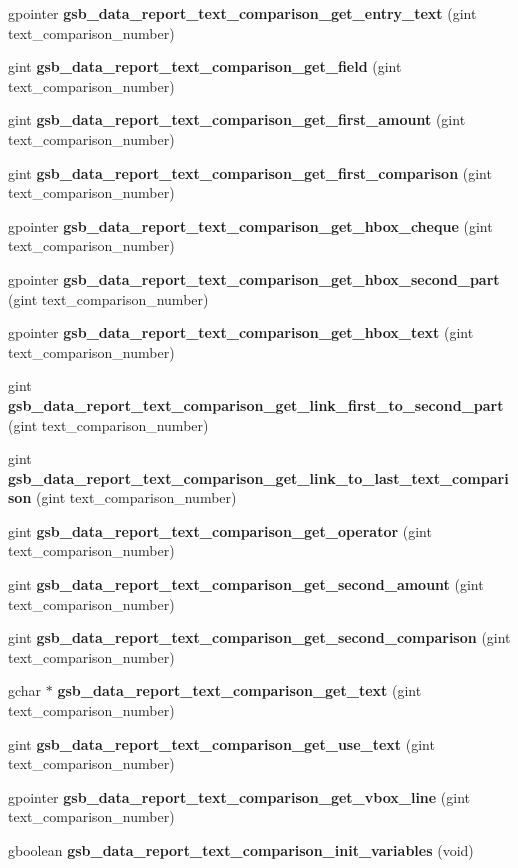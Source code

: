 \begin{DoxyCompactItemize}
gpointer {\bf gsb\_\-data\_\-report\_\-text\_\-comparison\_\-get\_\-entry\_\-text} (gint text\_\-comparison\_\-number)
\item 
gint {\bf gsb\_\-data\_\-report\_\-text\_\-comparison\_\-get\_\-field} (gint text\_\-comparison\_\-number)
\item 
gint {\bf gsb\_\-data\_\-report\_\-text\_\-comparison\_\-get\_\-first\_\-amount} (gint text\_\-comparison\_\-number)
\item 
gint {\bf gsb\_\-data\_\-report\_\-text\_\-comparison\_\-get\_\-first\_\-comparison} (gint text\_\-comparison\_\-number)
\item 
gpointer {\bf gsb\_\-data\_\-report\_\-text\_\-comparison\_\-get\_\-hbox\_\-cheque} (gint text\_\-comparison\_\-number)
\item 
gpointer {\bf gsb\_\-data\_\-report\_\-text\_\-comparison\_\-get\_\-hbox\_\-second\_\-part} (gint text\_\-comparison\_\-number)
\item 
gpointer {\bf gsb\_\-data\_\-report\_\-text\_\-comparison\_\-get\_\-hbox\_\-text} (gint text\_\-comparison\_\-number)
\item 
gint {\bf gsb\_\-data\_\-report\_\-text\_\-comparison\_\-get\_\-link\_\-first\_\-to\_\-second\_\-part} (gint text\_\-comparison\_\-number)
\item 
gint {\bf gsb\_\-data\_\-report\_\-text\_\-comparison\_\-get\_\-link\_\-to\_\-last\_\-text\_\-comparison} (gint text\_\-comparison\_\-number)
\item 
gint {\bf gsb\_\-data\_\-report\_\-text\_\-comparison\_\-get\_\-operator} (gint text\_\-comparison\_\-number)
\item 
gint {\bf gsb\_\-data\_\-report\_\-text\_\-comparison\_\-get\_\-second\_\-amount} (gint text\_\-comparison\_\-number)
\item 
gint {\bf gsb\_\-data\_\-report\_\-text\_\-comparison\_\-get\_\-second\_\-comparison} (gint text\_\-comparison\_\-number)
\item 
gchar $\ast$ {\bf gsb\_\-data\_\-report\_\-text\_\-comparison\_\-get\_\-text} (gint text\_\-comparison\_\-number)
\item 
gint {\bf gsb\_\-data\_\-report\_\-text\_\-comparison\_\-get\_\-use\_\-text} (gint text\_\-comparison\_\-number)
\item 
gpointer {\bf gsb\_\-data\_\-report\_\-text\_\-comparison\_\-get\_\-vbox\_\-line} (gint text\_\-comparison\_\-number)
\item 
gboolean {\bf gsb\_\-data\_\-report\_\-text\_\-comparison\_\-init\_\-variables} (void)
\item 

\end{DoxyCompactItemize}
